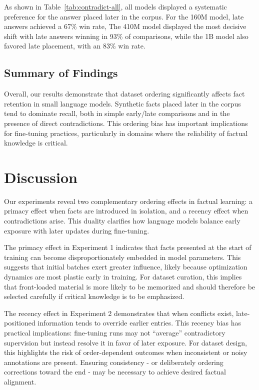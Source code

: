 \documentclass[11pt]{article}
\begin{document}
    As shown in Table~\ref{tab:contradict-all}, all models displayed a systematic preference for the answer placed later in the corpus. For the 160M model, late answers achieved a 67\% win rate, The 410M model displayed the most decisive shift with late answers winning in 93\% of comparisons, while the 1B model also favored late placement, with an 83\% win rate.


    \subsection{Summary of Findings}
    Overall, our results demonstrate that dataset ordering significantly affects fact retention in small language models. Synthetic facts placed later in the corpus tend to dominate recall, both in simple early/late comparisons and in the presence of direct contradictions. This ordering bias has important implications for fine-tuning practices, particularly in domains where the reliability of factual knowledge is critical.

    \section{Discussion}
    Our experiments reveal two complementary ordering effects in factual learning: a primacy effect when facts are introduced in isolation, and a recency effect when contradictions arise. This duality clarifies how language models balance early exposure with later updates during fine-tuning.

    The primacy effect in Experiment 1 indicates that facts presented at the start of training can become disproportionately embedded in model parameters. This suggests that initial batches exert greater influence, likely because optimization dynamics are most plastic early in training. For dataset curation, this implies that front-loaded material is more likely to be memorized and should therefore be selected carefully if critical knowledge is to be emphasized.

    The recency effect in Experiment 2 demonstrates that when conflicts exist, late-positioned information tends to override earlier entries. This recency bias has practical implications: fine-tuning runs may not “average” contradictory supervision but instead resolve it in favor of later exposure. For dataset design, this highlights the risk of order-dependent outcomes when inconsistent or noisy annotations are present. Ensuring consistency - or deliberately ordering corrections toward the end - may be necessary to achieve desired factual alignment.
\end{document}
